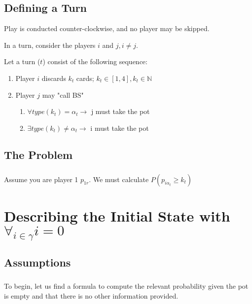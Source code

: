 \documentclass[letterpaper,11pt]{report}
\begin{document}
\begin{description}
    \section{Defining a Turn}
    \item Play is conducted counter-clockwise, and no player may be skipped.
    \item In a turn, consider the players $i$ and $j, i \neq j$.
    \item Let a turn ($t$) consist of the following sequence:
    \begin{enumerate}
        \item Player $i$ discards $k_t$ cards; $k_t \in [1,4], k_t \in \mathbb{N}$
        \item Player $j$ may "call BS"
        \begin{enumerate}
            \item $\forall type(k_t) = \alpha_t \rightarrow$ j must take the pot
            \item $\exists type(k_t) \neq \alpha_t \rightarrow$ i must take the pot
        \end{enumerate}
    \end{enumerate}
    \section{The Problem}
    \paragraph{} Assume you are player 1 $p_{1 r}$. We must calculate $P(p_{i \alpha_t} \geq k_t)$
\end{description}
\chapter{Describing the Initial State with $\forall_{i\in\gamma} i = 0$}
\section{Assumptions} 
\paragraph*{} To begin, let us find a formula to compute the relevant probability given the pot is empty and that there is no other information provided.
\end{document}
